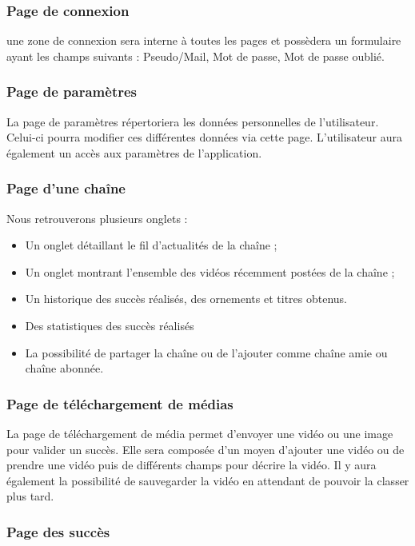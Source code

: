 \documentclass[a4paper,10pt]{article}
\begin{document}
\subsubsection{Page de connexion}

une zone de connexion sera interne à toutes les pages et possèdera un formulaire ayant les champs suivants : Pseudo/Mail, Mot de passe, Mot de passe oublié.

\subsubsection{Page de paramètres}

La page de paramètres répertoriera les données personnelles de l'utilisateur. Celui-ci pourra modifier ces différentes données via cette page. L'utilisateur aura également un accès aux paramètres de l'application.

\subsubsection{Page d'une chaîne}

Nous retrouverons plusieurs onglets : 
\begin{itemize}
\item Un onglet détaillant le fil d'actualités de la chaîne ;
\item Un onglet montrant l'ensemble des vidéos récemment postées de la chaîne ;
\item Un historique des succès réalisés, des ornements et titres obtenus.
\item Des statistiques des succès réalisés
\item La possibilité de partager la chaîne ou de l'ajouter comme chaîne amie ou chaîne abonnée.
\end{itemize}

\subsubsection{Page de téléchargement de médias}

La page de téléchargement de média permet d'envoyer une vidéo ou une image pour valider un succès. Elle sera composée d'un moyen d'ajouter une vidéo ou de prendre une vidéo puis de différents champs pour décrire la vidéo. Il y aura également la possibilité de sauvegarder la vidéo en attendant de pouvoir la classer plus tard.

\subsubsection{Page des succès}
\end{document}
